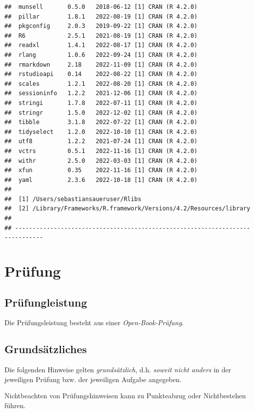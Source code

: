 \documentclass[
  a4paper,
  DIV=11]{scrreprt}
\theoremstyle{definition}
\theoremstyle{remark}
\begin{document}
\begin{verbatim}
##  munsell       0.5.0   2018-06-12 [1] CRAN (R 4.2.0)
##  pillar        1.8.1   2022-08-19 [1] CRAN (R 4.2.0)
##  pkgconfig     2.0.3   2019-09-22 [1] CRAN (R 4.2.0)
##  R6            2.5.1   2021-08-19 [1] CRAN (R 4.2.0)
##  readxl        1.4.1   2022-08-17 [1] CRAN (R 4.2.0)
##  rlang         1.0.6   2022-09-24 [1] CRAN (R 4.2.0)
##  rmarkdown     2.18    2022-11-09 [1] CRAN (R 4.2.0)
##  rstudioapi    0.14    2022-08-22 [1] CRAN (R 4.2.0)
##  scales        1.2.1   2022-08-20 [1] CRAN (R 4.2.0)
##  sessioninfo   1.2.2   2021-12-06 [1] CRAN (R 4.2.0)
##  stringi       1.7.8   2022-07-11 [1] CRAN (R 4.2.0)
##  stringr       1.5.0   2022-12-02 [1] CRAN (R 4.2.0)
##  tibble        3.1.8   2022-07-22 [1] CRAN (R 4.2.0)
##  tidyselect    1.2.0   2022-10-10 [1] CRAN (R 4.2.0)
##  utf8          1.2.2   2021-07-24 [1] CRAN (R 4.2.0)
##  vctrs         0.5.1   2022-11-16 [1] CRAN (R 4.2.0)
##  withr         2.5.0   2022-03-03 [1] CRAN (R 4.2.0)
##  xfun          0.35    2022-11-16 [1] CRAN (R 4.2.0)
##  yaml          2.3.6   2022-10-18 [1] CRAN (R 4.2.0)
## 
##  [1] /Users/sebastiansaueruser/Rlibs
##  [2] /Library/Frameworks/R.framework/Versions/4.2/Resources/library
## 
## ------------------------------------------------------------------------------
\end{verbatim}


\hypertarget{pruxfcfung}{%
\chapter{Prüfung}\label{pruxfcfung}}

\hypertarget{pruxfcfungleistung}{%
\section{Prüfungleistung}\label{pruxfcfungleistung}}

Die Prüfungsleistung besteht aus einer \emph{Open-Book-Prüfung}.

\hypertarget{grundsuxe4tzliches}{%
\section{Grundsätzliches}\label{grundsuxe4tzliches}}

Die folgenden Hinweise gelten \emph{grundsätzlich}, d.h. \emph{soweit
nicht anders} in der jeweiligen Prüfung bzw. der jeweiligen Aufgabe
angegeben.

Nichtbeachten von Prüfungshinweisen kann zu Punkteabzug oder
Nichtbestehen führen.
\end{document}

